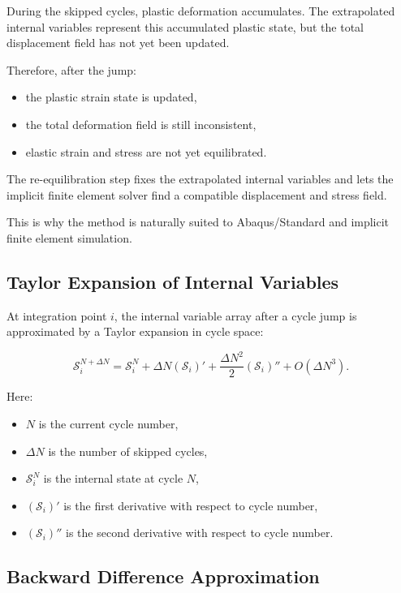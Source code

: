 ﻿\documentclass[11pt,a4paper]{article}
\begin{document}
During the skipped cycles, plastic deformation accumulates. The extrapolated internal variables represent this accumulated plastic state, but the total displacement field has not yet been updated.

Therefore, after the jump:

\begin{itemize}[leftmargin=*]
    \item the plastic strain state is updated,
    \item the total deformation field is still inconsistent,
    \item elastic strain and stress are not yet equilibrated.
\end{itemize}

The re-equilibration step fixes the extrapolated internal variables and lets the implicit finite element solver find a compatible displacement and stress field.

This is why the method is naturally suited to Abaqus/Standard and implicit finite element simulation.

\subsection{Taylor Expansion of Internal Variables}

At integration point $i$, the internal variable array after a cycle jump is approximated by a Taylor expansion in cycle space:

\[
\bm{\mathcal{S}}_{i}^{N+\Delta N}
=
\bm{\mathcal{S}}_{i}^{N}
+
\Delta N
\left(
\bm{\mathcal{S}}_{i}
\right)'
+
\frac{\Delta N^2}{2}
\left(
\bm{\mathcal{S}}_{i}
\right)''
+
O(\Delta N^3).
\]

Here:

\begin{itemize}[leftmargin=*]
    \item $N$ is the current cycle number,
    \item $\Delta N$ is the number of skipped cycles,
    \item $\bm{\mathcal{S}}_{i}^{N}$ is the internal state at cycle $N$,
    \item $(\bm{\mathcal{S}}_i)'$ is the first derivative with respect to cycle number,
    \item $(\bm{\mathcal{S}}_i)''$ is the second derivative with respect to cycle number.
\end{itemize}

\subsection{Backward Difference Approximation}
\end{document}
